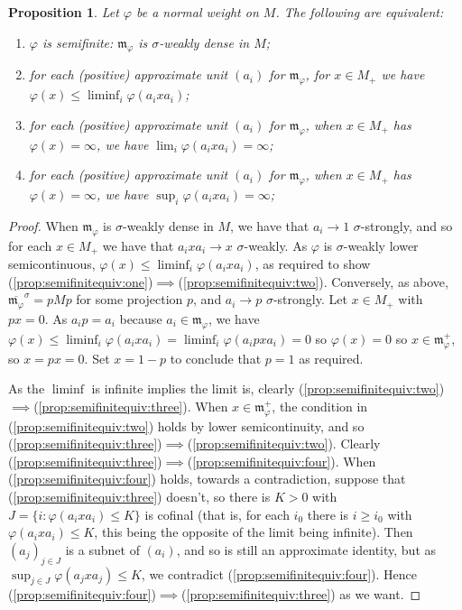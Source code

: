 \documentclass[a4paper,11pt]{article}
\theoremstyle{plain}
\newtheorem{proposition}{Proposition}[section]
\theoremstyle{remark}
\newcommand{\mf}[1]{\mathfrak{#1}}
\begin{document}
\begin{proposition}\label{prop:semifinitequiv}
Let $\varphi$ be a normal weight on $M$.  The following are equivalent:
\begin{enumerate}
  \item\label{prop:semifinitequiv:one} $\varphi$ is semifinite: $\mf m_\varphi$ is $\sigma$-weakly dense in $M$;
  \item\label{prop:semifinitequiv:two} for each (positive) approximate unit $(a_i)$ for $\mf m_\varphi$, for $x\in M_+$ we have $\varphi(x) \leq \liminf_i \varphi(a_i x a_i)$;
  \item\label{prop:semifinitequiv:three} for each (positive) approximate unit $(a_i)$ for $\mf m_\varphi$, when $x\in M_+$ has $\varphi(x)=\infty$, we have $\lim_i \varphi(a_i x a_i) = \infty$;
  \item\label{prop:semifinitequiv:four} for each (positive) approximate unit $(a_i)$ for $\mf m_\varphi$, when $x\in M_+$ has $\varphi(x)=\infty$, we have $\sup_i \varphi(a_i x a_i) = \infty$;
\end{enumerate}
\end{proposition}
\begin{proof}
When $\mf m_\varphi$ is $\sigma$-weakly dense in $M$, we have that $a_i \to 1$ $\sigma$-strongly, and so for each $x\in M_+$ we have that $a_i x a_i \to x$ $\sigma$-weakly.  As $\varphi$ is $\sigma$-weakly lower semicontinuous, $\varphi(x) \leq \liminf_i \varphi(a_ixa_i)$, as required to show (\ref{prop:semifinitequiv:one})$\implies$(\ref{prop:semifinitequiv:two}).
Conversely, as above, $\overline{\mf m_\varphi}^\sigma = pMp$ for some projection $p$, and $a_i \to p$ $\sigma$-strongly.  Let $x\in M_+$ with $px=0$.  As $a_i p = a_i$ because $a_i\in\mf m_\varphi$, we have $\varphi(x) \leq \liminf_i \varphi(a_ixa_i) = \liminf_i \varphi(a_ipxa_i) = 0$ so $\varphi(x)=0$ so $x\in\mf m_\varphi^+$, so $x = px = 0$.  Set $x=1-p$ to conclude that $p=1$ as required.

As the $\liminf$ is infinite implies the limit is, clearly (\ref{prop:semifinitequiv:two})$\implies$(\ref{prop:semifinitequiv:three}).  When $x\in\mf m_\varphi^+$, the condition in (\ref{prop:semifinitequiv:two}) holds by lower semicontinuity, and so (\ref{prop:semifinitequiv:three})$\implies$(\ref{prop:semifinitequiv:two}).  Clearly (\ref{prop:semifinitequiv:three})$\implies$(\ref{prop:semifinitequiv:four}).  When (\ref{prop:semifinitequiv:four}) holds, towards a contradiction, suppose that (\ref{prop:semifinitequiv:three}) doesn't, so there is $K>0$ with $J = \{ i : \varphi(a_ixa_i) \leq K \}$ is cofinal (that is, for each $i_0$ there is $i\geq i_0$ with $\varphi(a_ixa_i) \leq K$, this being the opposite of the limit being infinite).  Then $(a_j)_{j\in J}$ is a subnet of $(a_i)$, and so is still an approximate identity, but as $\sup_{j\in J} \varphi(a_jxa_j) \leq K$, we contradict (\ref{prop:semifinitequiv:four}).  Hence (\ref{prop:semifinitequiv:four})$\implies$(\ref{prop:semifinitequiv:three}) as we want.
\end{proof}








\end{document}
